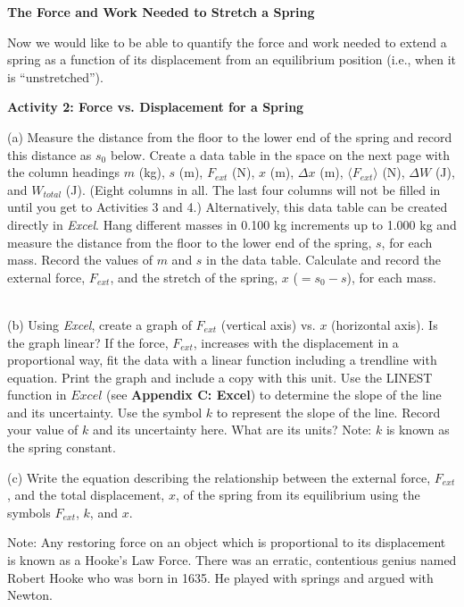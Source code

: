 \textbf{The Force and Work Needed to Stretch a Spring} 

Now we would like to be able to quantify the force and work needed to extend
a spring as a function of its displacement from an equilibrium position (i.e.,
when it is ``unstretched'').

\textbf{Activity 2: Force vs. Displacement for a Spring }

(a) Measure the distance from the floor to the lower end of the spring and record this distance as \( s_{0} \) below. Create a data table in the space on the
next page with the column headings $m$ (kg), $s$ (m), \( F_{ext} \) (N), 
$x$ (m), \( \Delta  x\)
(m), \(\langle F_{ext}\rangle \) (N), \( \Delta  W\) (J), and \( W_{total} \) (J). (Eight columns in all. The last four columns will not be filled in until you get to Activities 3 and 4.) Alternatively, this data table can be created directly in \textit{Excel}. Hang different masses in 0.100 kg increments up to 1.000 kg and measure the distance from the floor to the lower end of the spring, $s$, for each mass. Record the values of $m$ and $s$ in the data table. Calculate and record the external force, \( F_{ext} \), and the stretch of the spring, \(x\) (\(= s_{0} - s\)), for each mass.
\newpage
{\ \ \ }
 \vspace{60mm}

(b) Using \textit{Excel}, create a graph of \( F_{ext} \) (vertical axis) vs. 
$x$ (horizontal axis). Is the graph linear?
If the force, \( F_{ext} \), increases with the displacement in a proportional
way, fit the data with a linear function including a trendline with equation. 
Print the graph and include a copy with this unit. Use the LINEST function 
in $Excel$ (see \textbf{Appendix C: Excel}) to determine the slope of the 
line and its uncertainty. Use the symbol $k$ to represent the slope of the line.
Record your value of $k$ and its uncertainty here. What are its units? 
Note:  $k$ is known as the spring constant.
\vspace{10mm}

(c) Write the equation describing the relationship between the external force,
\( F_{ext} \), and the total displacement, 
$x$, of the spring from its equilibrium
using the symbols \( F_{ext} \), $k$, and $x$.
\vspace{10mm}

Note: Any restoring force on an object which is proportional to its displacement
is known as a Hooke's Law Force. There was an erratic, contentious genius named
Robert Hooke who was born in 1635. He played with springs and argued with 
Newton.


